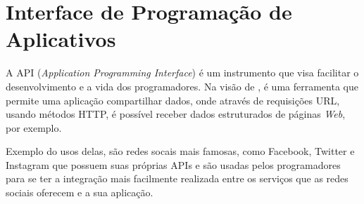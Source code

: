




\section{Interface de Programação de Aplicativos}
A API (\textit{Application Programming Interface}) é um instrumento que visa facilitar o desenvolvimento e a vida dos programadores. Na visão de \citet{makice2009}, é uma ferramenta que permite uma aplicação compartilhar dados, onde através de requisições URL, usando métodos HTTP, é possível receber dados estruturados de páginas \textit{Web}, por exemplo.

Exemplo do usos delas, são redes socais mais famosas, como Facebook, Twitter e Instagram que possuem suas próprias APIs e são usadas pelos programadores para se ter a integração mais facilmente realizada entre os serviços que as redes sociais oferecem e a sua aplicação.

